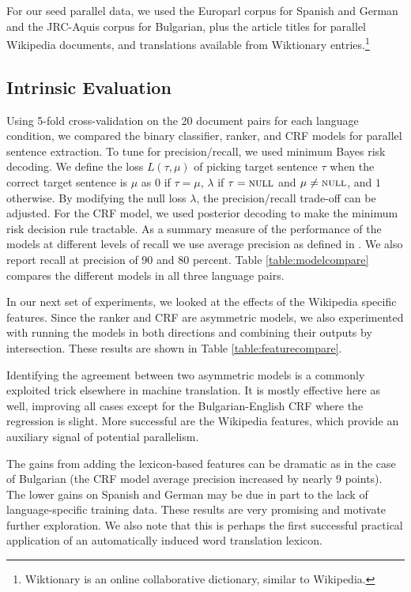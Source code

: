 For our seed parallel data, we used the Europarl corpus
\citep{Koehn05} for Spanish and German and the
JRC-Aquis corpus for Bulgarian, plus the article titles for
parallel Wikipedia documents, and translations available from
Wiktionary entries.\footnote{Wiktionary is an online collaborative
dictionary, similar to Wikipedia.} %

\subsection{Intrinsic Evaluation}
Using 5-fold cross-validation on the 20 document pairs for each
language condition, we compared the binary classifier, ranker, and
CRF models for parallel sentence extraction. To tune for 
precision/recall, we used minimum Bayes risk decoding.  We define
the loss $L(\tau,\mu)$ of picking target sentence $\tau$ when the
correct target sentence is $\mu$ as $0$ if $\tau=\mu$, $\lambda$ if
$\tau = \textsc{null}$ and $\mu\ne\textsc{null}$, and $1$ otherwise.
By modifying the null loss $\lambda$, the precision/recall
trade-off can be adjusted.  For the CRF model, we used posterior
decoding to make the minimum risk decision rule tractable. As a
summary measure of the performance of the models at different
levels of recall we use average precision as defined in
\citep{Ido06}. We also report recall at precision of 90 and
80 percent. %
 Table \ref{table:modelcompare} compares the
different models in all three language pairs.

In our next set of experiments, we looked at the effects of the Wikipedia
specific features.  Since the ranker and CRF are asymmetric models,
we also experimented with running the models in both directions and combining
their outputs by intersection.  These results are shown in Table \ref{table:featurecompare}.

Identifying the agreement between two asymmetric models is a commonly
exploited trick elsewhere in machine translation. It is mostly effective
here as well, improving all cases except for the Bulgarian-English CRF where
the regression is slight. More successful are the Wikipedia features, which
provide an auxiliary signal of potential parallelism.

The gains from adding the lexicon-based features can be dramatic
as in the case of Bulgarian (the CRF model average precision
increased by nearly 9 points). The lower gains on Spanish and
German may be due in part to the lack of language-specific
training data. These results are very promising and
motivate further exploration. We also note that this
is perhaps the first successful practical application of an
automatically induced word translation lexicon.


